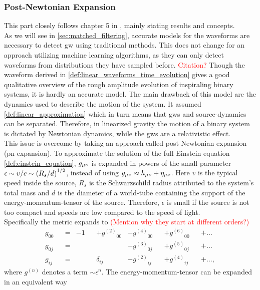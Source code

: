 \subsubsection{Post-Newtonian Expansion}\label{sec:pn_expansion}
This part closely follows chapter 5 in \cite{gwv1}, mainly stating results and concepts.\\
As we will see in \autoref{sec:matched_filtering}, accurate models for the waveforms are necessary to detect \gls{gw} using traditional methods. This does not change for an approach utilizing machine learning algorithms, as they can only detect waveforms from distributions they have sampled before. \textcolor{red}{Citation?} Though the waveform derived in \eqref{def:linear_waveforms_time_evolution} gives a good qualitative overview of the rough amplitude evolution of inspiraling binary systems, it is hardly an accurate model. The main drawback of this model are the dynamics used to describe the motion of the system. It assumed \eqref{def:linear_approximation} which in turn means that \gls{gws} and source-dynamics can be separated. Therefore, in linearized gravity the motion of a binary system is dictated by Newtonian dynamics, while the \gls{gws} are a relativistic effect.\\
This issue is overcome by taking an approach called post-Newtonian expansion (\gls{pn}-expansion). To approximate the solution of the full Einstein equation \eqref{def:einstein_equation}, $g_{\mu\nu}$ is expanded in powers of the small parameter $\epsilon\sim v/c \sim {\left( R_s / d \right)}^{1/2}$, instead of using $g_{\mu\nu}\approx h_{\mu\nu} +\eta_{\mu\nu}$. Here $v$ is the typical speed inside the source, $R_s$ is the Schwarzschild radius attributed to the system's total mass and $d$ is the diameter of a world-tube containing the support of the energy-momentum-tensor of the source. Therefore, $\epsilon$ is small if the source is not too compact and speeds are low compared to the speed of light.\\
Specifically the metric expands to \textcolor{red}{(Mention why they start at different orders?)}
\begin{align}\label{def:pn_expansion_metric}
g_{00} && = & -1 && +{g^{(2)}}_{00} & +{g^{(4)}}_{00} && +{g^{(6)}}_{00} && +\dotsc\nonumber\\
g_{0j} && = & && & +{g^{(3)}}_{0j} && +{g^{(5)}}_{0j} && +\dotsc\\
g_{ij} && = & &&\delta_{ij} & +{g^{(2)}}_{ij} && +{g^{(4)}}_{ij} && +\dotsc,\nonumber
\end{align}
where ${g^{(n)}}$ denotes a term $\sim \epsilon^n$. The energy-momentum-tensor can be expanded in an equivalent way
